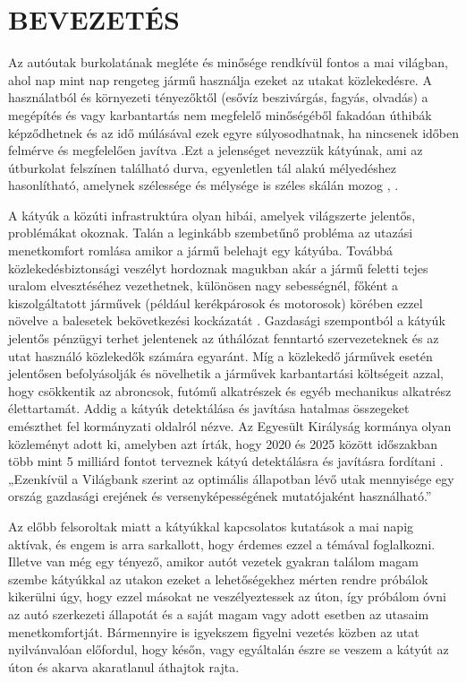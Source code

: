 \section{BEVEZETÉS}

Az autóutak burkolatának megléte és minősége rendkívül fontos a mai
világban, ahol nap mint nap rengeteg jármű használja ezeket az utakat
közlekedésre. A használatból és környezeti tényezőktől (esővíz
beszivárgás, fagyás, olvadás) a megépítés és vagy karbantartás nem
megfelelő minőségéből fakadóan úthibák képződhetnek és az idő múlásával
ezek egyre súlyosodhatnak, ha nincsenek időben felmérve és megfelelően
javítva \cite{abedAnalysisPredictionPothole2023} .Ezt a jelenséget nevezzük kátyúnak, ami az útburkolat
felszínen található durva, egyenletlen tál alakú mélyedéshez
hasonlítható, amelynek szélessége és mélysége is széles skálán mozog
\cite{millerDistressIdentificationManual2014}, \cite{safyariReviewVisionBasedPothole2024}.

A kátyúk a közúti infrastruktúra olyan hibái, amelyek világszerte
jelentős, problémákat okoznak. Talán a leginkább szembetűnő probléma az
utazási menetkomfort romlása amikor a jármű belehajt egy kátyúba.
Továbbá közlekedésbiztonsági veszélyt hordoznak magukban akár a jármű
feletti tejes uralom elvesztéséhez vezethetnek, különösen nagy
sebességnél, főként a kiszolgáltatott járművek (például kerékpárosok és
motorosok) körében ezzel növelve a balesetek bekövetkezési kockázatát
\cite{yalewIMPACTPOTHOLEROAD2023}. Gazdasági szempontból a kátyúk jelentős pénzügyi terhet
jelentenek az úthálózat fenntartó szervezeteknek és az utat használó
közlekedők számára egyaránt. Míg a közlekedő járművek esetén jelentősen
befolyásolják és növelhetik a járművek karbantartási költségeit azzal,
hogy csökkentik az abroncsok, futómű alkatrészek és egyéb mechanikus
alkatrész élettartamát. Addig a kátyúk detektálása és javítása hatalmas
összegeket emészthet fel kormányzati oldalról nézve. Az Egyesült
Királyság kormánya olyan közleményt adott ki, amelyben azt írták, hogy
2020 és 2025 között időszakban több mint 5 milliárd fontot terveznek
kátyú detektálásra és javításra fordítani \cite{safyariReviewVisionBasedPothole2024}. „Ezenkívül a Világbank
szerint az optimális állapotban lévő utak mennyisége egy ország
gazdasági erejének és versenyképességének mutatójaként használható.''
\cite{martinez-riosReviewRoadSurface2022}

Az előbb felsoroltak miatt a kátyúkkal kapcsolatos kutatások a mai napig
aktívak, és engem is arra sarkallott, hogy érdemes ezzel a témával
foglalkozni. Illetve van még egy tényező, amikor autót vezetek gyakran
találom magam szembe kátyúkkal az utakon ezeket a lehetőségekhez mérten
rendre próbálok kikerülni úgy, hogy ezzel másokat ne veszélyeztessek az
úton, így próbálom óvni az autó szerkezeti állapotát és a saját magam
vagy adott esetben az utasaim menetkomfortját. Bármennyire is igyekszem
figyelni vezetés közben az utat nyilvánvalóan előfordul, hogy későn,
vagy egyáltalán észre se veszem a kátyút az úton és akarva akaratlanul
áthajtok rajta.

